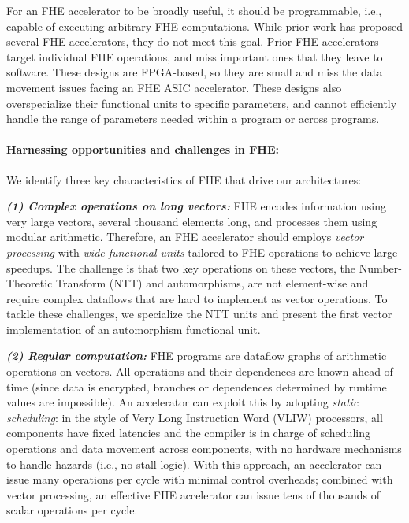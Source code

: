 For an FHE accelerator to be broadly useful, it should be programmable, i.e.,
capable of executing arbitrary FHE computations. While prior work has proposed
several FHE accelerators, they do not meet this goal. Prior FHE
accelerators~\cite{cousins:hpec14:fpga-he,cousins:tetc17:fpga-he,doroz:tc15:accelerating-fhe,roy:hpca19:fpga-he,riazi:asplos20:heax,turan:tc20:heaws}
target individual FHE operations, and miss important ones that they leave to
software. These designs are FPGA-based, so they are small and miss the data
movement issues facing an FHE ASIC accelerator. These designs also
overspecialize their functional units to specific parameters, and cannot
efficiently handle the range of parameters needed within a program or across
programs.

\paragraph{Harnessing opportunities and challenges in FHE:}
We identify three key characteristics of FHE that drive our architectures:

\noindent \textbf{\emph{(1) Complex operations on long vectors:}}
FHE encodes information using very large vectors, several thousand elements
long, and processes them using modular arithmetic. Therefore, an FHE accelerator should employs \emph{vector
processing} with \emph{wide functional units} tailored to FHE operations to
achieve large speedups. The challenge is that two key operations on these
vectors, the Number-Theoretic Transform (NTT) and automorphisms, are not
element-wise and require complex dataflows that are hard to implement as vector
operations. To tackle these challenges, we specialize the NTT units and present
the first vector implementation of an automorphism functional unit.

\noindent \textbf{\emph{(2) Regular computation:}}
FHE programs are dataflow graphs of arithmetic operations on vectors. All
operations and their dependences are known ahead of time (since data is
encrypted, branches or dependences determined by runtime values are
impossible). An accelerator can exploit this by adopting \emph{static
scheduling}: in the style of Very Long Instruction Word (VLIW) processors, all
components have fixed latencies and the compiler is in charge of scheduling
operations and data movement across components, with no hardware mechanisms to
handle hazards (i.e., no stall logic). With this approach, an accelerator can
issue many operations per cycle with minimal control overheads; combined with
vector processing, an effective FHE accelerator can issue tens of thousands of
scalar operations per cycle.

